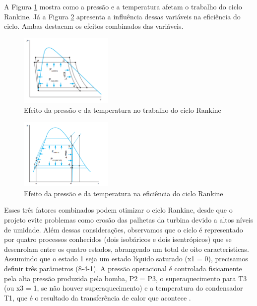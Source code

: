 \documentclass[
	article,			%
	11pt,				%
	oneside,			%
	a4paper,			%
	english,			%
	brazil,				%
	sumario=tradicional
	]{abntex2}
\begin{document}
A Figura \ref{fig:efeito-pressao-temperatura} mostra como a pressão e a temperatura afetam o trabalho do ciclo Rankine. Já a Figura \ref{fig:efeito-pressao-temperatura-eficiencia} apresenta a influência dessas variáveis na eficiência do ciclo. Ambas destacam os efeitos combinados das variáveis.

\begin{figure}[h]
	\centering
	\includegraphics[width=0.4\textwidth]{./images/efeito-pressao-temperatura.png}
	\caption{Efeito da pressão e da temperatura no trabalho do ciclo Rankine}
	\label{fig:efeito-pressao-temperatura}
\end{figure}

\begin{figure}
	\centering
	\includegraphics[width=0.4\textwidth]{./images/efeito-pressao-temperatura-eficiencia.png}
	\caption{Efeito da pressão e da temperatura na eficiência do ciclo Rankine}
	\label{fig:efeito-pressao-temperatura-eficiencia}
\end{figure}

Esses três fatores combinados podem otimizar o ciclo Rankine, desde que o projeto evite problemas como erosão das palhetas da turbina devido a altos níveis de umidade.
Além dessas considerações, observamos que o ciclo é representado por quatro processos conhecidos (dois isobáricos e dois isentrópicos) que se desenrolam entre os quatro estados, abrangendo um total de oito características. Assumindo que o estado 1 seja um estado líquido saturado (x1 = 0), precisamos definir três parâmetros (8-4-1). A pressão operacional é controlada fisicamente pela alta pressão produzida pela bomba, P2 = P3, o superaquecimento para T3 (ou x3 = 1, se não houver superaquecimento) e a temperatura do condensador T1, que é o resultado da transferência de calor que acontece \cite{borgnakke-2020}.
\end{document}

